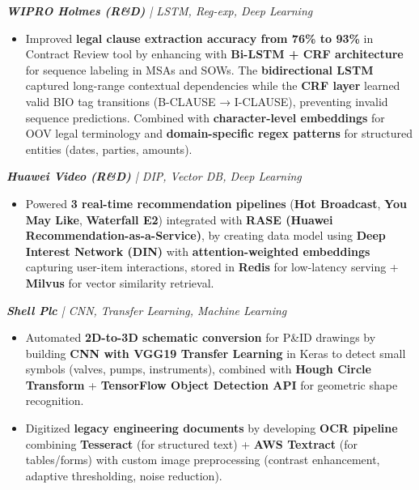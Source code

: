 \documentclass[letterpaper,10pt]{article}
\newcommand{\resumeItem}[1]{
  \item\small{
    {#1 \vspace{-2pt}}
  }
}
\newcommand{\resumeItemListStart}{\begin{itemize}}
\newcommand{\resumeItemListEnd}{\end{itemize}\vspace{-5pt}}
\begin{document}
      \vspace{12pt}
      \vspace{12pt}
      \textit{\small\textbf{WIPRO Holmes (R\&D)} | LSTM, Reg-exp, Deep Learning}
      \resumeItemListStart
        \resumeItem{Improved \textbf{legal clause extraction accuracy from 76\% to 93\%} in Contract Review tool by enhancing with \textbf{Bi-LSTM + CRF architecture} for sequence labeling in MSAs and SOWs. The \textbf{bidirectional LSTM} captured long-range contextual dependencies while the \textbf{CRF layer} learned valid BIO tag transitions (B-CLAUSE → I-CLAUSE), preventing invalid sequence predictions. Combined with \textbf{character-level embeddings} for OOV legal terminology and \textbf{domain-specific regex patterns} for structured entities (dates, parties, amounts).}
        \resumeItemListEnd

      \vspace{12pt}
      \vspace{12pt}
      \vspace{12pt}
      \vspace{12pt}
      \textit{\small\textbf{Huawei Video (R\&D)} | DIP, Vector DB, Deep Learning}
      \resumeItemListStart
        \resumeItem{Powered \textbf{3 real-time recommendation pipelines} (\textbf{Hot Broadcast}, \textbf{You May Like}, \textbf{Waterfall E2}) integrated with \textbf{RASE (Huawei Recommendation-as-a-Service)}, by creating data model using \textbf{Deep Interest Network (DIN)} with \textbf{attention-weighted embeddings} capturing user-item interactions, stored in \textbf{Redis} for low-latency serving + \textbf{Milvus} for vector similarity retrieval.}
        \resumeItemListEnd
        
      \vspace{12pt}
      \textit{\small\textbf{Shell Plc} | CNN, Transfer Learning, Machine Learning}
      \resumeItemListStart
        \resumeItem{Automated \textbf{2D-to-3D schematic conversion} for P\&ID drawings by building \textbf{CNN with VGG19 Transfer Learning} in Keras to detect small symbols (valves, pumps, instruments), combined with \textbf{Hough Circle Transform} + \textbf{TensorFlow Object Detection API} for geometric shape recognition.}
        \resumeItem{Digitized \textbf{legacy engineering documents} by developing \textbf{OCR pipeline} combining \textbf{Tesseract} (for structured text) + \textbf{AWS Textract} (for tables/forms) with custom image preprocessing (contrast enhancement, adaptive thresholding, noise reduction).}
      \resumeItemListEnd
\end{document}
